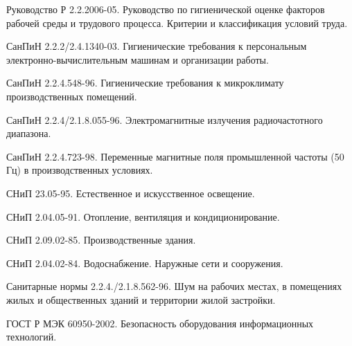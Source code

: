    Руководство Р 2.2.2006-05.
                                    Руководство по гигиенической оценке факторов
                                    рабочей среды и трудового процесса. Критерии
                                    и классификация условий труда.

    СанПиН 2.2.2/2.4.1340-03.
                                    Гигиенические требования к персональным
                                    электронно-вычислительным машинам и
                                    организации работы.

     СанПиН 2.2.4.548-96.
                                    Гигиенические требования к микроклимату
                                    производственных помещений.

     СанПиН 2.2.4/2.1.8.055-96.
                                    Электромагнитные излучения радиочастотного
                                    диапазона.

     СанПиН 2.2.4.723-98.
                                    Переменные магнитные поля промышленной
                                    частоты (50 Гц) в производственных условиях.

     СНиП 23.05-95.
                                    Естественное и искусственное освещение.

     СНиП 2.04.05-91.
                                    Отопление, вентиляция и кондиционирование.

    СНиП 2.09.02-85.
                                Производственные здания.

    СНиП 2.04.02-84.
                                Водоснабжение.
                                Наружные сети и сооружения.

  Санитарные нормы 2.2.4./2.1.8.562-96.
                                        Шум на рабочих местах, в помещениях
                                        жилых и общественных зданий и
                                        территории жилой застройки.

   ГОСТ Р МЭК 60950-2002.
                                    Безопасность оборудования информационных
                                    технологий.

